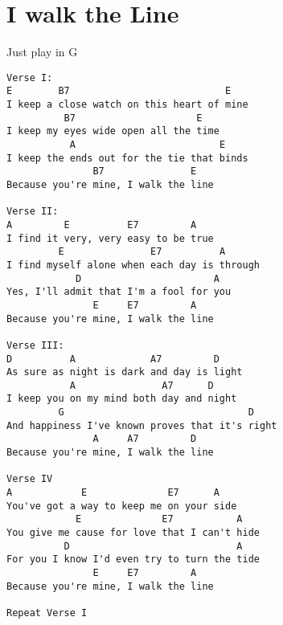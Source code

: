 \documentclass[leqno]{memoir}
\begin{document}
\chapter{I walk the Line}
Just play in G\\
\begin{verbatim}
Verse I:
E        B7                           E
I keep a close watch on this heart of mine
          B7                     E
I keep my eyes wide open all the time
           A                         E
I keep the ends out for the tie that binds
               B7               E
Because you're mine, I walk the line

Verse II:
A         E          E7         A
I find it very, very easy to be true
         E               E7          A
I find myself alone when each day is through
            D                       A
Yes, I'll admit that I'm a fool for you
               E     E7         A
Because you're mine, I walk the line

Verse III:
D          A             A7         D
As sure as night is dark and day is light
           A               A7      D
I keep you on my mind both day and night
         G                                D
And happiness I've known proves that it's right
               A     A7         D
Because you're mine, I walk the line

Verse IV
A            E              E7      A
You've got a way to keep me on your side
            E              E7           A
You give me cause for love that I can't hide
          D                             A
For you I know I'd even try to turn the tide
               E     E7         A
Because you're mine, I walk the line

Repeat Verse I
\end{verbatim}
\newpage
\end{document}
